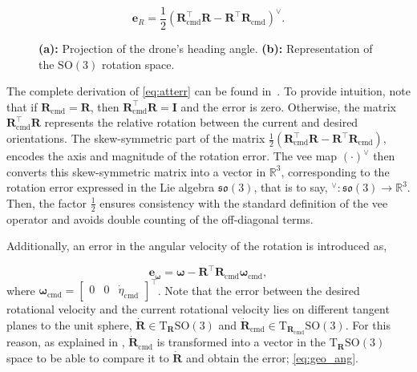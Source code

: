 \begin{equation}\label{eq:atterr}
    \mathbf{e}_R = \frac{1}{2} \left( \mathbf{R}_{\text{cmd}}^\top \mathbf{R} - \mathbf{R}^\top \mathbf{R}_{\text{cmd}} \right)^\vee. 
\end{equation}

\begin{figure}[H]
    \centering
    \scalebox{0.9}{%
        \begin{minipage}{\textwidth}
            \centering
            \subfloat[ ]{
                
                \label{fig:simp_drone}
            }
            \hfill
            \subfloat[]{
                
                \label{fig:so3_sphere}
            }
        \end{minipage}
    }
    \caption{\textbf{(a):} Projection of the drone's heading angle. \textbf{(b):} Representation of the $\mathrm{SO}(3)$ rotation space. }
    \label{ooo}
\end{figure}

\noindent The complete derivation of \eqref{eq:atterr} can be found in~\cite{lee_geometric_2010}. 
To provide intuition, note that if $\mathbf{R}_{\text{cmd}} = \mathbf{R}$, then $\mathbf{R}_{\text{cmd}}^\top \mathbf{R} = \mathbf{I}$ and the error is zero. 
Otherwise, the matrix $\mathbf{R}_{\text{cmd}}^\top \mathbf{R}$ represents the relative rotation between the current and desired orientations. 
The skew-symmetric part of the matrix  $\frac{1}{2}(\mathbf{R}_{\text{cmd}}^\top \mathbf{R} - \mathbf{R}^\top \mathbf{R}_{\text{cmd}})$, encodes the axis and magnitude of the rotation error. 
The vee map $(\cdot)^\vee$ then converts this skew-symmetric matrix into a vector in $\mathbb{R}^3$, corresponding to the rotation error expressed in the Lie algebra $\mathfrak{so}(3)$, that is to say, $^\vee \colon \mathfrak{so}(3) \to \mathbb{R}^3$.
Then, the factor $\frac{1}{2}$ ensures consistency with the standard definition of the vee operator and avoids double counting of the off-diagonal terms.



Additionally, an error in the angular velocity of the rotation is introduced as,

\begin{equation}\label{eq:geo_ang}
    \mathbf{e}_{\boldsymbol{\omega}} = \boldsymbol{\omega} - \mathbf{R}^\top \mathbf{R}_{\text{cmd}}\boldsymbol{\omega}_{\text{cmd}},
\end{equation}
where $\boldsymbol{\omega}_{\text{cmd}} = \begin{bmatrix}
    0 & 0 & \dot{\eta}_{\text{cmd}}\end{bmatrix}^\top$. 
Note that the error between the desired rotational velocity and the current rotational velocity lies on different tangent planes to the unit sphere, 
$\dot{\mathbf{R}} \in \mathrm{T}_{\mathbf{R}} \mathrm{SO}(3)$ and $\dot{\mathbf{R}}_{\text{cmd}} \in \mathrm{T}_{\mathbf{R}_{\text{cmd}}} \mathrm{SO}(3)$.
For this reason, as explained in \cite{lee_geometric_2010}, $\dot{\mathbf{R}}_{\text{cmd}}$ is transformed into a vector in the $\mathrm{T}_{\mathbf{R}} \mathrm{SO}(3)$ space to be able to compare it to $\dot{\mathbf{R}}$ and obtain the error; \eqref{eq:geo_ang}.

